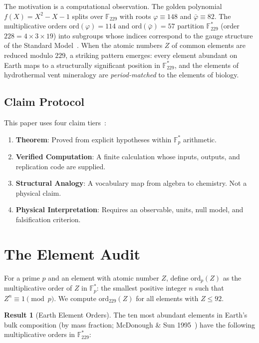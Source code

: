 \documentclass[12pt]{article}
\theoremstyle{principia}
\theoremstyle{definition}
\newtheorem{result}[theorem]{Result}
\theoremstyle{remark}
\providecommand{\FF}{\mathbb{F}}
\providecommand{\vp}{\varphi}
\providecommand{\vpbar}{\bar{\varphi}}
\begin{document}
The motivation is a computational observation. The golden polynomial $f(X) = X^2 - X - 1$ splits over $\FF_{229}$ with roots $\vp \equiv 148$ and $\vpbar \equiv 82$. The multiplicative orders $\mathrm{ord}(\vp) = 114$ and $\mathrm{ord}(\vpbar) = 57$ partition $\FF_{229}^*$ (order $228 = 4 \times 3 \times 19$) into subgroups whose indices correspond to the gauge structure of the Standard Model~\cite{LaRue_PP}. When the atomic numbers $Z$ of common elements are reduced modulo $229$, a striking pattern emerges: every element abundant on Earth maps to a structurally significant position in $\FF_{229}^*$, and the elements of hydrothermal vent mineralogy are \emph{period-matched} to the elements of biology.

\subsection{Claim Protocol}
This paper uses four claim tiers~\cite{LaRue_PP}:
\begin{enumerate}[noitemsep]
    \item \textbf{Theorem}: Proved from explicit hypotheses within $\FF_p^*$ arithmetic.
    \item \textbf{Verified Computation}: A finite calculation whose inputs, outputs, and replication code are supplied.
    \item \textbf{Structural Analogy}: A vocabulary map from algebra to chemistry. Not a physical claim.
    \item \textbf{Physical Interpretation}: Requires an observable, units, null model, and falsification criterion.
\end{enumerate}

\section{The Element Audit}\label{sec:audit}

For a prime $p$ and an element with atomic number $Z$, define $\mathrm{ord}_p(Z)$ as the multiplicative order of $Z$ in $\FF_p^*$: the smallest positive integer $n$ such that $Z^n \equiv 1 \pmod{p}$. We compute $\mathrm{ord}_{229}(Z)$ for all elements with $Z \leq 92$.

\begin{result}[Earth Element Orders]\label{res:earth_audit}
The ten most abundant elements in Earth's bulk composition (by mass fraction; McDonough \& Sun 1995~\cite{McDonough95}) have the following multiplicative orders in $\FF_{229}^*$:
\end{result}
\end{document}
